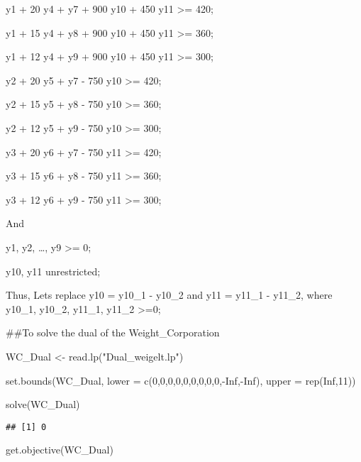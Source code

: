 \documentclass[
]{article}
\newenvironment{Shaded}{\begin{snugshade}}{\end{snugshade}}
\newcommand{\AttributeTok}[1]{\textcolor[rgb]{0.77,0.63,0.00}{#1}}
\newcommand{\ConstantTok}[1]{\textcolor[rgb]{0.00,0.00,0.00}{#1}}
\newcommand{\DecValTok}[1]{\textcolor[rgb]{0.00,0.00,0.81}{#1}}
\newcommand{\FunctionTok}[1]{\textcolor[rgb]{0.00,0.00,0.00}{#1}}
\newcommand{\NormalTok}[1]{#1}
\newcommand{\OtherTok}[1]{\textcolor[rgb]{0.56,0.35,0.01}{#1}}
\newcommand{\SpecialCharTok}[1]{\textcolor[rgb]{0.00,0.00,0.00}{#1}}
\newcommand{\StringTok}[1]{\textcolor[rgb]{0.31,0.60,0.02}{#1}}
\begin{document}
y1 + 20 y4 + y7 + 900 y10 + 450 y11 \textgreater= 420;

y1 + 15 y4 + y8 + 900 y10 + 450 y11 \textgreater= 360;

y1 + 12 y4 + y9 + 900 y10 + 450 y11 \textgreater= 300;

y2 + 20 y5 + y7 - 750 y10 \textgreater= 420;

y2 + 15 y5 + y8 - 750 y10 \textgreater= 360;

y2 + 12 y5 + y9 - 750 y10 \textgreater= 300;

y3 + 20 y6 + y7 - 750 y11 \textgreater= 420;

y3 + 15 y6 + y8 - 750 y11 \textgreater= 360;

y3 + 12 y6 + y9 - 750 y11 \textgreater= 300;

And

y1, y2, \ldots, y9 \textgreater= 0;

y10, y11 unrestricted;

Thus, Lets replace y10 = y10\_1 - y10\_2 and y11 = y11\_1 - y11\_2,
where y10\_1, y10\_2, y11\_1, y11\_2 \textgreater=0;

\#\#To solve the dual of the Weight\_Corporation

\begin{Shaded}
\begin{Highlighting}[]
\NormalTok{WC\_Dual }\OtherTok{\textless{}{-}} \FunctionTok{read.lp}\NormalTok{(}\StringTok{"Dual\_weigelt.lp"}\NormalTok{)}

\FunctionTok{set.bounds}\NormalTok{(WC\_Dual, }\AttributeTok{lower =} \FunctionTok{c}\NormalTok{(}\DecValTok{0}\NormalTok{,}\DecValTok{0}\NormalTok{,}\DecValTok{0}\NormalTok{,}\DecValTok{0}\NormalTok{,}\DecValTok{0}\NormalTok{,}\DecValTok{0}\NormalTok{,}\DecValTok{0}\NormalTok{,}\DecValTok{0}\NormalTok{,}\DecValTok{0}\NormalTok{,}\SpecialCharTok{{-}}\ConstantTok{Inf}\NormalTok{,}\SpecialCharTok{{-}}\ConstantTok{Inf}\NormalTok{), }\AttributeTok{upper =} \FunctionTok{rep}\NormalTok{(}\ConstantTok{Inf}\NormalTok{,}\DecValTok{11}\NormalTok{))}

\FunctionTok{solve}\NormalTok{(WC\_Dual)}
\end{Highlighting}
\end{Shaded}

\begin{verbatim}
## [1] 0
\end{verbatim}

\begin{Shaded}
\begin{Highlighting}[]
\FunctionTok{get.objective}\NormalTok{(WC\_Dual)}
\end{Highlighting}
\end{Shaded}
\end{document}
